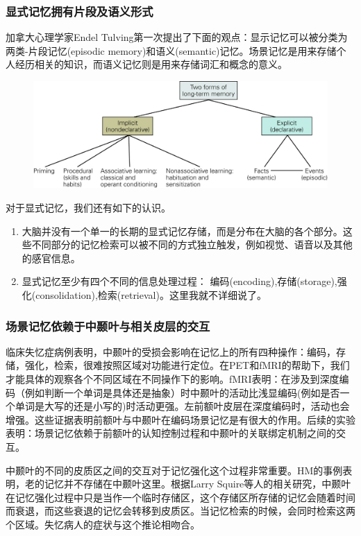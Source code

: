 \documentclass[UTF8,nofonts]{ctexart}
\begin{document}
\subsubsection{显式记忆拥有片段及语义形式}
加拿大心理学家Endel Tulving第一次提出了下面的观点：显示记忆可以被分类为两类-片段记忆(episodic memory)和语义(semantic)记忆。场景记忆是用来存储个人经历相关的知识，而语义记忆则是用来存储词汇和概念的意义。
\begin{figure}[h]
\centering
\includegraphics{Pic/6505_PNS5.jpg}
\end{figure}
对于显式记忆，我们还有如下的认识。
\begin{enumerate}
\item 大脑并没有一个单一的长期的显式记忆存储，而是分布在大脑的各个部分。这些不同部分的记忆检索可以被不同的方式独立触发，例如视觉、语音以及其他的感官信息。
\item 显式记忆至少有四个不同的信息处理过程： 编码(encoding),存储(storage),强化(consolidation),检索(retrieval)。这里我就不详细说了。
\end{enumerate}
\subsubsection{场景记忆依赖于中颞叶与相关皮层的交互}
临床失忆症病例表明，中颞叶的受损会影响在记忆上的所有四种操作：编码，存储，强化，检索，很难按照区域对功能进行定位。在PET和fMRI的帮助下，我们才能具体的观察各个不同区域在不同操作下的影响。fMRI表明：在涉及到深度编码（例如判断一个单词是具体还是抽象）时中颞叶的活动比浅显编码(例如是否一个单词是大写的还是小写的)时活动更强。左前额叶皮层在深度编码时，活动也会增强。这些证据表明前额叶与中颞叶在编码场景记忆是有很大的作用。后续的实验表明：场景记忆依赖于前额叶的认知控制过程和中颞叶的关联绑定机制之间的交互。
\par
中颞叶的不同的皮质区之间的交互对于记忆强化这个过程非常重要。HM的事例表明，老的记忆并不存储在中颞叶这里。根据Larry Squire等人的相关研究，中颞叶在记忆强化过程中只是当作一个临时存储区，这个存储区所存储的记忆会随着时间而衰退，而这些衰退的记忆会转移到皮质区。当记忆检索的时候，会同时检索这两个区域。失忆病人的症状与这个推论相吻合。
\par
\end{document}
